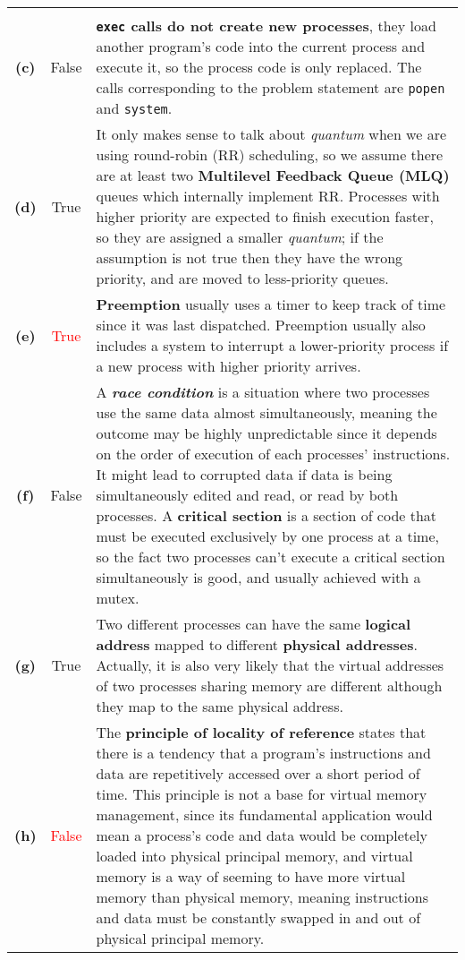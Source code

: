 {\begin{center}
\begin{longtable}{c | c p{132mm}}
\begin{minipage}{0.34\textwidth}
        \end{minipage} \\
        \textbf{(c)} & False & \textbf{\texttt{exec} calls do not create new processes}, they load another program's code into the current process and execute it, so the process code is only replaced. The calls corresponding to the problem statement are \texttt{popen} and \texttt{system}. \\
        \textbf{(d)} & True & It only makes sense to talk about \emph{quantum} when we are using round-robin (RR) scheduling, so we assume there are at least two \textbf{Multilevel Feedback Queue (MLQ)} queues which internally implement RR. Processes with higher priority are expected to finish execution faster, so they are assigned a smaller \emph{quantum}; if the assumption is not true then they have the wrong priority, and are moved to less-priority queues. \\
        \textbf{(e)} & \textcolor{red}{True} & \textbf{Preemption} usually uses a timer to keep track of time since it was last dispatched. Preemption usually also includes a system to interrupt a lower-priority process if a new process with higher priority arrives. \\
        \textbf{(f)} & False & A \textbf{\emph{race condition}} is a situation where two processes use the same data almost simultaneously, meaning the outcome may be highly unpredictable since it depends on the order of execution of each processes' instructions. It might lead to corrupted data if data is being simultaneously edited and read, or read by both processes. A \textbf{critical section} is a section of code that must be executed exclusively by one process at a time, so the fact two processes can't execute a critical section simultaneously is good, and usually achieved with a mutex. \\
        \textbf{(g)} & True & Two different processes can have the same \textbf{logical address} mapped to different \textbf{physical addresses}. Actually, it is also very likely that the virtual addresses of two processes sharing memory are different although they map to the same physical address. \\
        \textbf{(h)} & \textcolor{red}{False} & The \textbf{principle of locality of reference} states that there is a tendency that a program's instructions and data are repetitively accessed over a short period of time. This principle is not a base for virtual memory management, since its fundamental application would mean a process's code and data would be completely loaded into physical principal memory, and virtual memory is a way of seeming to have more virtual memory than physical memory, meaning instructions and data must be constantly swapped in and out of physical principal memory. \\

\end{longtable}
\end{center}}
